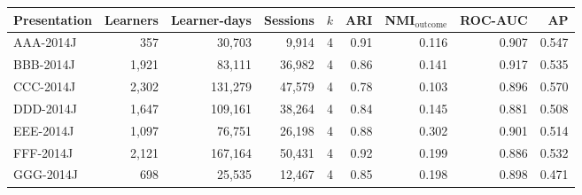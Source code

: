 \begin{tabular}{l r r r r r r r r}
\toprule
Presentation & Learners & Learner-days & Sessions & $k$ & ARI & NMI$_{\mathrm{outcome}}$ & ROC-AUC & AP \\
\midrule
AAA-2014J & 357 & 30{,}703 & 9{,}914 & 4 & 0.91 & 0.116 & 0.907 & 0.547 \\
BBB-2014J & 1{,}921 & 83{,}111 & 36{,}982 & 4 & 0.86 & 0.141 & 0.917 & 0.535 \\
CCC-2014J & 2{,}302 & 131{,}279 & 47{,}579 & 4 & 0.78 & 0.103 & 0.896 & 0.570 \\
DDD-2014J & 1{,}647 & 109{,}161 & 38{,}264 & 4 & 0.84 & 0.145 & 0.881 & 0.508 \\
EEE-2014J & 1{,}097 & 76{,}751 & 26{,}198 & 4 & 0.88 & 0.302 & 0.901 & 0.514 \\
FFF-2014J & 2{,}121 & 167{,}164 & 50{,}431 & 4 & 0.92 & 0.199 & 0.886 & 0.532 \\
GGG-2014J & 698 & 25{,}535 & 12{,}467 & 4 & 0.85 & 0.198 & 0.898 & 0.471 \\
\bottomrule
\end{tabular}
